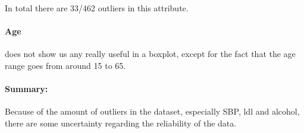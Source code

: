 In total there are 33/462 outliers in this attribute.

\paragraph{Age} does not show us any really useful in a boxplot, except for the fact that the age range goes from around 15 to 65.

\paragraph{Summary:} Because of the amount of outliers in the dataset, especially SBP, ldl and alcohol, there are some uncertainty regarding the reliability of the data.

